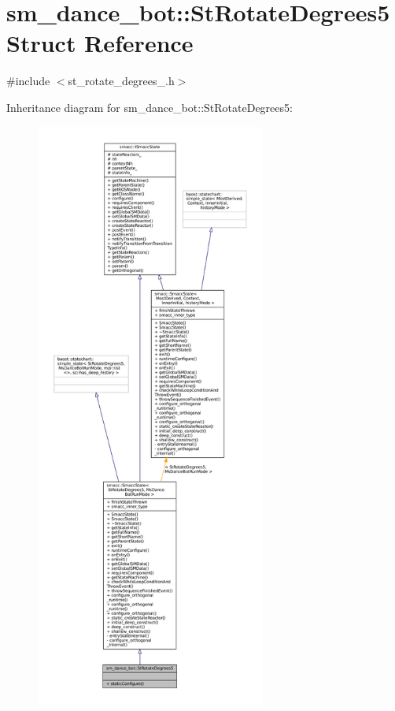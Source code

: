 \hypertarget{structsm__dance__bot_1_1StRotateDegrees5}{}\section{sm\+\_\+dance\+\_\+bot\+:\+:St\+Rotate\+Degrees5 Struct Reference}
\label{structsm__dance__bot_1_1StRotateDegrees5}


{\ttfamily \#include $<$st\+\_\+rotate\+\_\+degrees\+\_.\+h$>$}



Inheritance diagram for sm\+\_\+dance\+\_\+bot\+:\+:St\+Rotate\+Degrees5\+:
\nopagebreak
\begin{figure}[H]
\begin{center}
\leavevmode
\includegraphics[height=550pt]{structsm__dance__bot_1_1StRotateDegrees5__inherit__graph}
\end{center}
\end{figure}


